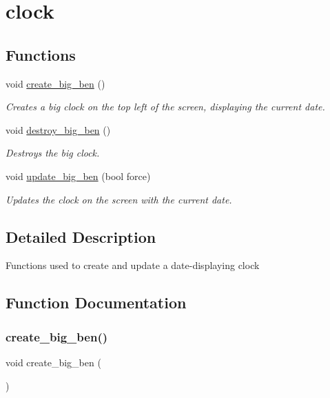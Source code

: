 \hypertarget{group__clock}{}\section{clock}
\label{group__clock}
\subsection*{Functions}
\begin{DoxyCompactItemize}
\item 
void \mbox{\hyperlink{group__clock_ga59029f76a2cbf7aad54d01f50cf80cf9}{create\+\_\+big\+\_\+ben}} ()
\begin{DoxyCompactList}\small\item\em Creates a big clock on the top left of the screen, displaying the current date. \end{DoxyCompactList}\item 
void \mbox{\hyperlink{group__clock_ga74cbf0ece67234028fdd0465d51bfc0d}{destroy\+\_\+big\+\_\+ben}} ()
\begin{DoxyCompactList}\small\item\em Destroys the big clock. \end{DoxyCompactList}\item 
void \mbox{\hyperlink{group__clock_gac56b75476d51e272a9efcbb174ed7bf8}{update\+\_\+big\+\_\+ben}} (bool force)
\begin{DoxyCompactList}\small\item\em Updates the clock on the screen with the current date. \end{DoxyCompactList}\end{DoxyCompactItemize}


\subsection{Detailed Description}
Functions used to create and update a date-\/displaying clock 

\subsection{Function Documentation}
\mbox{\label{group__clock_ga59029f76a2cbf7aad54d01f50cf80cf9}} 
\subsubsection{\texorpdfstring{create\+\_\+big\+\_\+ben()}{create\_big\_ben()}}
{\footnotesize\ttfamily void create\+\_\+big\+\_\+ben (\begin{DoxyParamCaption}{ }\end{DoxyParamCaption})}



